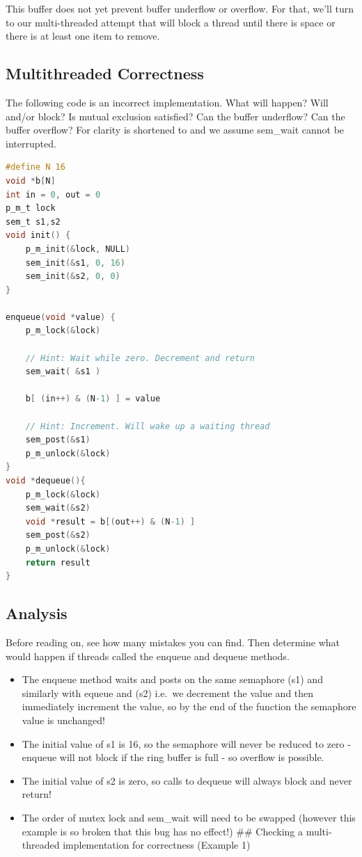 This buffer does not yet prevent buffer underflow or overflow. For that, we'll turn to our multi-threaded attempt that will block a thread until there is space or there is at least one item to remove.


\subsection{Multithreaded Correctness}\label{checking-a-multi-threaded-implementation-for-correctness-example-1}

The following code is an incorrect implementation. What will happen? Will  and/or  block? Is mutual exclusion satisfied? Can the buffer underflow? Can the buffer overflow? For clarity  is shortened to  and we assume sem\_wait cannot be interrupted.

\begin{lstlisting}[language=C]
#define N 16
void *b[N]
int in = 0, out = 0
p_m_t lock
sem_t s1,s2
void init() { 
    p_m_init(&lock, NULL)
    sem_init(&s1, 0, 16)
    sem_init(&s2, 0, 0)
}

enqueue(void *value) {
    p_m_lock(&lock)

    // Hint: Wait while zero. Decrement and return
    sem_wait( &s1 ) 
 
    b[ (in++) & (N-1) ] = value

    // Hint: Increment. Will wake up a waiting thread 
    sem_post(&s1) 
    p_m_unlock(&lock)
}
void *dequeue(){
    p_m_lock(&lock)
    sem_wait(&s2)
    void *result = b[(out++) & (N-1) ]
    sem_post(&s2)
    p_m_unlock(&lock)
    return result
}
\end{lstlisting}

\subsection{Analysis}\label{analysis}

Before reading on, see how many mistakes you can find. Then determine what would happen if threads called the enqueue and dequeue methods.

\begin{itemize}
\tightlist
\item
  The enqueue method waits and posts on the same semaphore (s1) and similarly with equeue and (s2) i.e.~we decrement the value and then immediately increment the value, so by the end of the function the semaphore value is unchanged!
\item
  The initial value of s1 is 16, so the semaphore will never be reduced to zero - enqueue will not block if the ring buffer is full - so overflow is possible.
\item
  The initial value of s2 is zero, so calls to dequeue will always block and never return!
\item
  The order of mutex lock and sem\_wait will need to be swapped (however this example is so broken that this bug has no effect!) \#\# Checking a multi-threaded implementation for correctness (Example 1)
\end{itemize}

